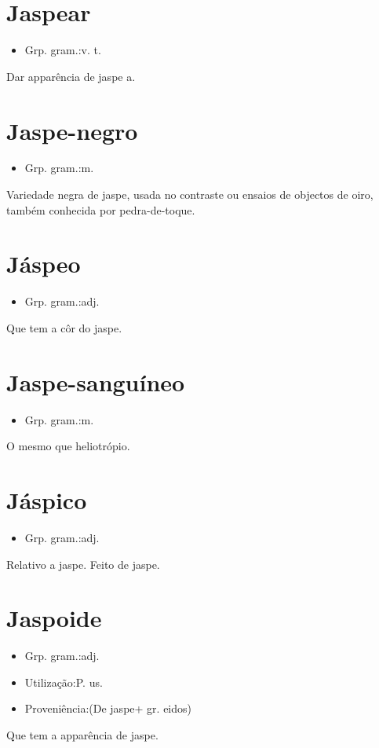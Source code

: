 \documentclass{article}
\begin{document}
\section{Jaspear}
\begin{itemize}
\item {Grp. gram.:v. t.}
\end{itemize}
Dar apparência de jaspe a.
\section{Jaspe-negro}
\begin{itemize}
\item {Grp. gram.:m.}
\end{itemize}
Variedade negra de jaspe, usada no contraste ou ensaios de objectos de oiro, também conhecida por \textunderscore pedra-de-toque\textunderscore .
\section{Jáspeo}
\begin{itemize}
\item {Grp. gram.:adj.}
\end{itemize}
Que tem a côr do jaspe.
\section{Jaspe-sanguíneo}
\begin{itemize}
\item {Grp. gram.:m.}
\end{itemize}
O mesmo que \textunderscore heliotrópio\textunderscore .
\section{Jáspico}
\begin{itemize}
\item {Grp. gram.:adj.}
\end{itemize}
Relativo a jaspe.
Feito de jaspe.
\section{Jaspoide}
\begin{itemize}
\item {Grp. gram.:adj.}
\end{itemize}
\begin{itemize}
\item {Utilização:P. us.}
\end{itemize}
\begin{itemize}
\item {Proveniência:(De \textunderscore jaspe\textunderscore  + gr. \textunderscore eidos\textunderscore )}
\end{itemize}
Que tem a apparência de jaspe.
\end{document}
